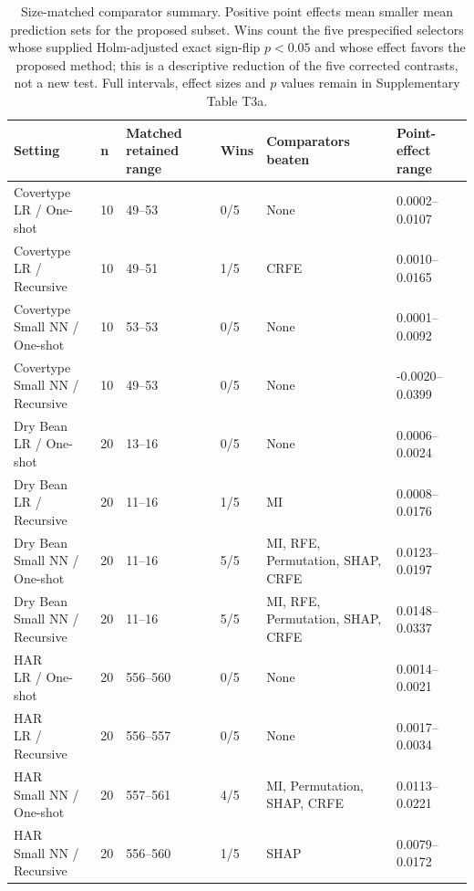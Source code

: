 \begin{table}[t]
\centering
\caption{Size-matched comparator summary. Positive point effects mean smaller mean prediction sets for the proposed subset. Wins count the five prespecified selectors whose supplied Holm-adjusted exact sign-flip $p<0.05$ and whose effect favors the proposed method; this is a descriptive reduction of the five corrected contrasts, not a new test. Full intervals, effect sizes and $p$ values remain in Supplementary Table T3a.}
\label{tab:t3-baseline-compact}
\scriptsize
\begin{tabular}{llllll}
\hline
Setting & n & Matched retained range & Wins & Comparators beaten & Point-effect range \\
\hline
\shortstack{Covertype\\LR / One-shot} & 10 & 49--53 & 0/5 & None & 0.0002--0.0107 \\
\shortstack{Covertype\\LR / Recursive} & 10 & 49--51 & 1/5 & CRFE & 0.0010--0.0165 \\
\shortstack{Covertype\\Small NN / One-shot} & 10 & 53--53 & 0/5 & None & 0.0001--0.0092 \\
\shortstack{Covertype\\Small NN / Recursive} & 10 & 49--53 & 0/5 & None & -0.0020--0.0399 \\
\shortstack{Dry Bean\\LR / One-shot} & 20 & 13--16 & 0/5 & None & 0.0006--0.0024 \\
\shortstack{Dry Bean\\LR / Recursive} & 20 & 11--16 & 1/5 & MI & 0.0008--0.0176 \\
\shortstack{Dry Bean\\Small NN / One-shot} & 20 & 11--16 & 5/5 & MI, RFE, Permutation, SHAP, CRFE & 0.0123--0.0197 \\
\shortstack{Dry Bean\\Small NN / Recursive} & 20 & 11--16 & 5/5 & MI, RFE, Permutation, SHAP, CRFE & 0.0148--0.0337 \\
\shortstack{HAR\\LR / One-shot} & 20 & 556--560 & 0/5 & None & 0.0014--0.0021 \\
\shortstack{HAR\\LR / Recursive} & 20 & 556--557 & 0/5 & None & 0.0017--0.0034 \\
\shortstack{HAR\\Small NN / One-shot} & 20 & 557--561 & 4/5 & MI, Permutation, SHAP, CRFE & 0.0113--0.0221 \\
\shortstack{HAR\\Small NN / Recursive} & 20 & 556--560 & 1/5 & SHAP & 0.0079--0.0172 \\
\hline
\end{tabular}
\end{table}
